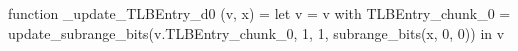 function _update_TLBEntry_d0 (v, x) = let v = { v with TLBEntry_chunk_0 = update_subrange_bits(v.TLBEntry_chunk_0, 1, 1, subrange_bits(x, 0, 0)) } in
  v
